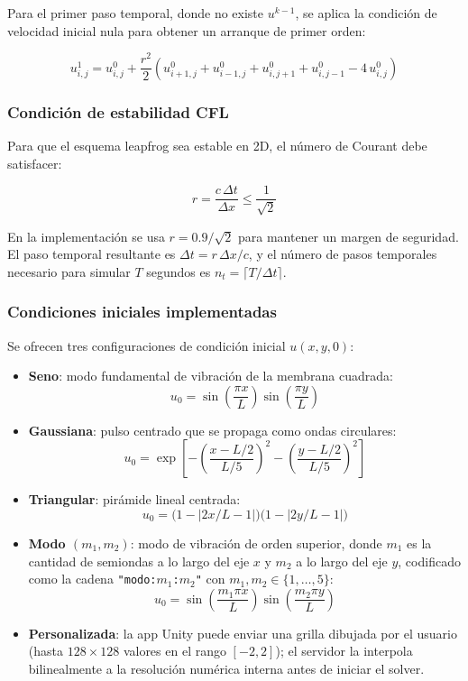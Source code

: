 \documentclass[12pt, a4paper]{article}
\begin{document}
Para el primer paso temporal, donde no existe $u^{k-1}$, se aplica la condición de
velocidad inicial nula para obtener un arranque de primer orden:

\begin{equation}
    u^1_{i,j} = u^0_{i,j} + \frac{r^2}{2}
    \left(u^0_{i+1,j} + u^0_{i-1,j} + u^0_{i,j+1} + u^0_{i,j-1}
    - 4\,u^0_{i,j}\right)
\end{equation}

\subsubsection{Condición de estabilidad CFL}

Para que el esquema leapfrog sea estable en 2D, el número de Courant debe satisfacer:

\begin{equation}
    r = \frac{c\,\Delta t}{\Delta x} \leq \frac{1}{\sqrt{2}}
    \label{eq:cfl-onda}
\end{equation}

En la implementación se usa $r = 0.9/\sqrt{2}$ para mantener un margen de seguridad.
El paso temporal resultante es $\Delta t = r\,\Delta x / c$, y el número de pasos
temporales necesario para simular $T$ segundos es $n_t = \lceil T / \Delta t \rceil$.

\subsubsection{Condiciones iniciales implementadas}

Se ofrecen tres configuraciones de condición inicial $u(x,y,0)$:

\begin{itemize}
    \item \textbf{Seno}: modo fundamental de vibración de la membrana cuadrada:
    \[u_0 = \sin\!\left(\frac{\pi x}{L}\right)\sin\!\left(\frac{\pi y}{L}\right)\]
    \item \textbf{Gaussiana}: pulso centrado que se propaga como ondas circulares:
    \[u_0 = \exp\!\left[-\left(\frac{x-L/2}{L/5}\right)^{\!2}
            -\left(\frac{y-L/2}{L/5}\right)^{\!2}\right]\]
    \item \textbf{Triangular}: pirámide lineal centrada:
    \[u_0 = \bigl(1-|2x/L-1|\bigr)\bigl(1-|2y/L-1|\bigr)\]
    \item \textbf{Modo $(m_1,m_2)$}: modo de vibración de orden superior, donde
    $m_1$ es la cantidad de semiondas a lo largo del eje $x$ y $m_2$ a lo largo del
    eje $y$, codificado como la cadena \texttt{"modo:$m_1$:$m_2$"} con
    $m_1,m_2\in\{1,\ldots,5\}$:
    \[u_0 = \sin\!\left(\frac{m_1\pi x}{L}\right)\sin\!\left(\frac{m_2\pi y}{L}\right)\]
    \item \textbf{Personalizada}: la app Unity puede enviar una grilla dibujada por el
    usuario (hasta $128\times128$ valores en el rango $[-2,2]$); el servidor la
    interpola bilinealmente a la resolución numérica interna antes de iniciar el solver.
\end{itemize}
\end{document}
